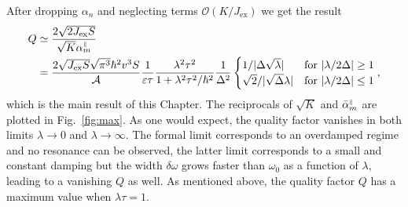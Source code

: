 After dropping $\alpha_n$ and neglecting terms $\mathcal{O}(K/J_\text{ex})$ we get the result
\begin{align}
    Q &\simeq \frac{2\sqrt{2J_\text{ex}S}}{\sqrt{K}{\alpha}_m^{{\scriptscriptstyle\parallel}}}\nonumber\\
    &=\frac{2\sqrt{J_\text{ex}S}\sqrt{\pi^3}\hbar^2v^3S}{\mathcal{A}}\frac{1}{\varepsilon\tau}\frac{\lambda^2\tau^2}{1+\lambda^2\tau^2/\hbar^2}\frac{1}{\Delta^2}
    \begin{cases}
        1/|\Delta\sqrt{\lambda}|
        &  \text{for } |\lambda/2\Delta| \geq 1 \\
        \sqrt{2}/|\sqrt{\Delta}\lambda|
        &  \text{for } |\lambda/2\Delta| \leq 1 
    \end{cases},
\end{align}
which is the main result of this Chapter. The reciprocals of $\sqrt{K}$ and $\bar{\alpha}_m^{{\scriptscriptstyle\parallel}}$ are plotted in Fig.~\ref{fig:max}. As one would expect, the quality factor vanishes in both limits $\lambda\rightarrow0$ and $\lambda\rightarrow\infty$. The formal limit corresponds to an overdamped regime and no resonance can be observed, the latter limit corresponds to a small and constant damping but the width $\delta\omega$ grows faster than $\omega_0$ as a function of $\lambda$, leading to a vanishing $Q$ as well. As mentioned above, the quality factor $Q$ has a maximum value when $\lambda\tau=1$. 

